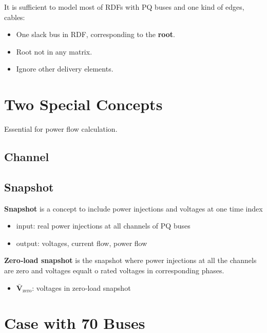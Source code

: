 \documentclass[
]{book}
\providecommand{\tightlist}{%
  \setlength{\itemsep}{0pt}\setlength{\parskip}{0pt}}
\begin{document}
It is sufficient to model most of RDFs with PQ buses and one kind of edges,
cables:

\begin{itemize}
\tightlist
\item
  One slack bus in RDF, corresponding to the \textbf{root}.
\item
  Root not in any matrix.
\item
  Ignore other delivery elements.
\end{itemize}

\hypertarget{two-special-concepts}{%
\section{Two Special Concepts}\label{two-special-concepts}}

Essential for power flow calculation.

\hypertarget{channel}{%
\subsection{Channel}\label{channel}}

\hypertarget{snapshot}{%
\subsection{Snapshot}\label{snapshot}}

\textbf{Snapshot} is a concept to include power injections and voltages at one time
index

\begin{itemize}
\tightlist
\item
  input: real power injections at all channels of PQ buses
\item
  output: voltages, current flow, power flow
\end{itemize}

\textbf{Zero‐load snapshot} is the snapshot where power injections at all the
channels are zero and voltages equalt o rated voltages in corresponding phases.

\begin{itemize}
\tightlist
\item
  \(\boldsymbol{\bar{V}}_\text{zero}\): voltages in zero‐load snapshot
\end{itemize}

\hypertarget{case}{%
\section{Case with 70 Buses}\label{case}}
\end{document}
